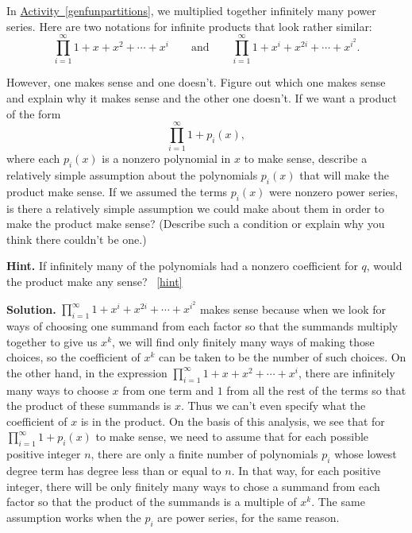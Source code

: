 \documentclass{book}
\begin{document}
\setcounter{project}{320}
\addtocounter{project}{-1}
\begin{activity}[]\label{activity-313}
\hypertarget{p-1619}{}%
In \hyperref[genfunpartitions]{Activity~\ref{genfunpartitions}}, we multiplied together infinitely many power series. Here are two notations for infinite products that look rather similar:%
\begin{equation*}
\prod_{i=1}^\infty 1 + x + x^2 +\cdots+ x^i\qquad\mbox{and}\qquad
\prod_{i=1}^\infty 1 +x^i +x^{2i} +\cdots + x^{i^2}.
\end{equation*}
%
\par
\hypertarget{p-1620}{}%
However, one makes sense and one doesn't. Figure out which one makes sense and explain why it makes sense and the other one doesn't. If we want a product of the form%
\begin{equation*}
\prod_{i=1}^\infty 1 +p_i(x),
\end{equation*}
where each \(p_i(x)\) is a nonzero polynomial in \(x\) to make sense, describe a relatively simple assumption about the polynomials \(p_i(x)\) that will make the product make sense. If we assumed the terms \(p_i(x)\) were nonzero power series, is there a relatively simple assumption we could make about them in order to make the product make sense? (Describe such a condition or explain why you think there couldn't be one.)%
\par\smallskip%
\noindent\textbf{Hint.}\hypertarget{hint-211}{}\quad%
\hypertarget{p-1621}{}%
If infinitely many of the polynomials had a nonzero coefficient for \(q\), would the product make any sense?%
~\hfill{\tiny\hyperlink{a-320}{[hint]}\hypertarget{q-320}{}}\par\smallskip%
\noindent\textbf{Solution.}\hypertarget{solution-228}{}\quad%
\hypertarget{p-1622}{}%
\(\prod_{i=1}^\infty 1 +x^i +x^{2i} +\cdots + x^{i^2}\) makes sense because when we look for ways of choosing one summand from each factor so that the summands multiply together to give us \(x^k\), we will find only finitely many ways of making those choices, so the coefficient of \(x^k\) can be taken to be the number of such choices. On the other hand, in the expression \(\prod_{i=1}^\infty 1 + x + x^2 +\cdots+ x^i\), there are infinitely many ways to choose \(x\) from one term and \(1\) from all the rest of the terms so that the product of these summands is \(x\). Thus we can't even specify what the coefficient of \(x\) is in the product. On the basis of this analysis, we see that for \(\prod_{i=1}^\infty 1 +p_i(x)\) to make sense, we need to assume that for each possible positive integer \(n\), there are only a finite number of polynomials \(p_i\) whose lowest degree term has degree less than or equal to \(n\). In that way, for each positive integer, there will be only finitely many ways to chose a summand from each factor so that the product of the summands is a multiple of \(x^k\). The same assumption works when the \(p_i\) are power series, for the same reason.%
\end{activity}
\end{document}
